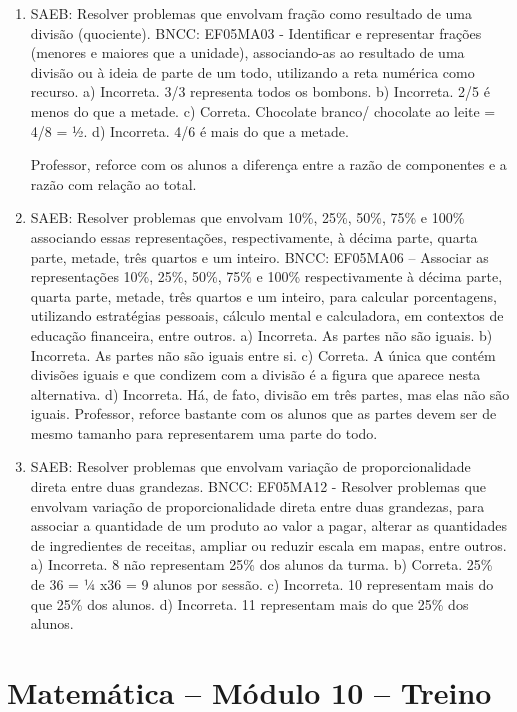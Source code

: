 \begin{enumerate}
\item
SAEB: Resolver problemas que envolvam fração como resultado de uma divisão (quociente).
BNCC: EF05MA03 - Identificar e representar frações (menores e maiores que a unidade),
associando-as ao resultado de uma divisão ou à ideia de parte de um todo, utilizando a reta
numérica como recurso.
a) Incorreta. 3/3 representa todos os bombons.
b) Incorreta. 2/5 é menos do que a metade.
c) Correta. Chocolate branco/ chocolate ao leite = 4/8 = ½.
d) Incorreta. 4/6 é mais do que a metade.

Professor, reforce com os alunos a diferença entre a razão de componentes e a razão com relação ao total.

\item
SAEB: Resolver problemas que envolvam 10\%, 25\%, 50\%, 75\% e 100\% associando essas representações, respectivamente, à décima parte, quarta parte, metade, três quartos e um inteiro.
BNCC: EF05MA06 – Associar as representações 10\%, 25\%, 50\%, 75\% e 100\% respectivamente à
décima parte, quarta parte, metade, três quartos e um inteiro, para calcular porcentagens,
utilizando estratégias pessoais, cálculo mental e calculadora, em contextos de educação
financeira, entre outros.
a) Incorreta. As partes não são iguais.
b) Incorreta. As partes não são iguais entre si.
c) Correta. A única que contém divisões iguais e que condizem com a divisão é a figura que aparece nesta alternativa.
d) Incorreta. Há, de fato, divisão em três partes, mas elas não são iguais.
Professor, reforce bastante com os alunos que as partes devem ser de
mesmo tamanho para representarem uma parte do todo.

\item
SAEB: Resolver problemas que envolvam variação de proporcionalidade direta entre duas grandezas.
BNCC: EF05MA12 - Resolver problemas que envolvam variação de proporcionalidade direta entre
duas grandezas, para associar a quantidade de um produto ao valor a pagar, alterar as
quantidades de ingredientes de receitas, ampliar ou reduzir escala em mapas, entre outros.
a) Incorreta. 8 não representam 25\% dos alunos da turma.
b) Correta. 25\% de 36 = ¼ x36 = 9 alunos por sessão.
c) Incorreta. 10 representam mais do que 25\% dos alunos.
d) Incorreta. 11 representam mais do que 25\% dos alunos.
\end{enumerate}

\section*{Matemática -- Módulo 10 -- Treino}

